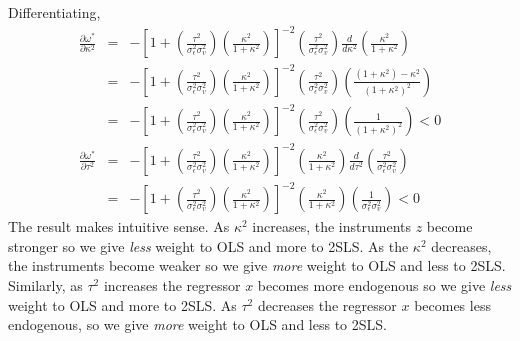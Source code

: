 \documentclass[12pt]{article}
\theoremstyle{definition}
\begin{document}
Differentiating,
  \begin{eqnarray*}
    \frac{\partial \omega^*}{\partial \kappa^2} &=& -\left[1 + \left(\frac{\tau^2}{\sigma_\epsilon^2 \sigma_v^2}\right)\left( \frac{\kappa^2}{1 + \kappa^2}\right)\right]^{-2} \left( \frac{\tau^2}{\sigma_\epsilon^2 \sigma_v^2} \right) \frac{d}{d\kappa^2} \left(\frac{\kappa^2}{1 + \kappa^2} \right)\\
      &=&  -\left[1 + \left(\frac{\tau^2}{\sigma_\epsilon^2 \sigma_v^2}\right)\left( \frac{\kappa^2}{1 + \kappa^2}\right)\right]^{-2} \left( \frac{\tau^2}{\sigma_\epsilon^2 \sigma_v^2} \right)  \left(\frac{(1+ \kappa^2) - \kappa^2}{(1 + \kappa^2)^2} \right)\\
      &=& -\left[1 + \left(\frac{\tau^2}{\sigma_\epsilon^2 \sigma_v^2}\right)\left( \frac{\kappa^2}{1 + \kappa^2}\right)\right]^{-2} \left( \frac{\tau^2}{\sigma_\epsilon^2 \sigma_v^2} \right)  \left(\frac{1}{(1 + \kappa^2)^2} \right) < 0\\
    \frac{\partial \omega^*}{\partial \tau^2} &=&-\left[1 + \left(\frac{\tau^2}{\sigma_\epsilon^2 \sigma_v^2}\right)\left( \frac{\kappa^2}{1 + \kappa^2}\right)\right]^{-2}\left(\frac{\kappa^2}{1 + \kappa^2} \right)\frac{d}{d\tau^2}\left( \frac{\tau^2}{\sigma_\epsilon^2 \sigma_v^2} \right) \\
    &=&-\left[1 + \left(\frac{\tau^2}{\sigma_\epsilon^2 \sigma_v^2}\right)\left( \frac{\kappa^2}{1 + \kappa^2}\right)\right]^{-2}\left(\frac{\kappa^2}{1 + \kappa^2} \right)\left( \frac{1}{\sigma_\epsilon^2 \sigma_v^2} \right) < 0 
  \end{eqnarray*}
The result makes intuitive sense. As $\kappa^2$ increases, the instruments $z$ become stronger so we give \emph{less} weight to OLS and more to 2SLS. As the $\kappa^2$ decreases, the instruments become weaker so we give \emph{more} weight to OLS and less to 2SLS. Similarly, as $\tau^2$ increases the regressor $x$ becomes more endogenous so we give \emph{less} weight to OLS and more to 2SLS. As $\tau^2$ decreases the regressor $x$ becomes less endogenous, so we give \emph{more} weight to OLS and less to 2SLS.
\end{document}
